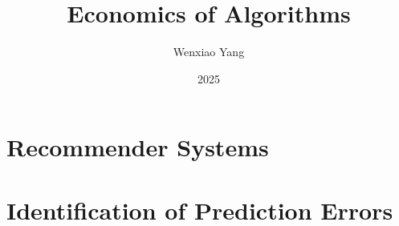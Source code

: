\documentclass[11pt]{elegantbook}
\title{Economics of Algorithms}
\author{Wenxiao Yang}
\institute{Haas School of Business, University of California Berkeley}
\date{2025}
\begin{document}
\maketitle

\frontmatter
\tableofcontents

\mainmatter


\chapter{Recommender Systems}






\chapter{Identification of Prediction Errors}

















\end{document}
